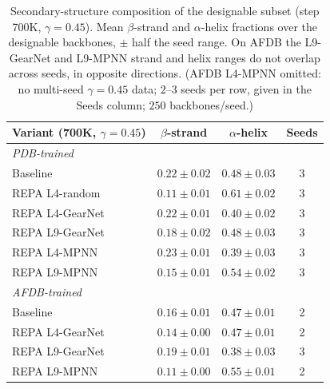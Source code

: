\begin{table}[tbp]
\centering
\small
\setlength{\tabcolsep}{8pt}
\begin{tabular}{lccc}
\toprule
\textbf{Variant (700K, $\gamma{=}0.45$)} & \textbf{$\beta$-strand} & \textbf{$\alpha$-helix} & \textbf{Seeds} \\
\midrule
\multicolumn{4}{l}{\textit{PDB-trained}}\\
Baseline       & $0.22 \pm 0.02$ & $0.48 \pm 0.03$ & 3 \\
REPA L4-random & $0.11 \pm 0.01$ & $0.61 \pm 0.02$ & 3 \\
REPA L4-GearNet     & $0.22 \pm 0.01$ & $0.40 \pm 0.02$ & 3 \\
REPA L9-GearNet     & $0.18 \pm 0.02$ & $0.48 \pm 0.03$ & 3 \\
REPA L4-MPNN   & $0.23 \pm 0.01$ & $0.39 \pm 0.03$ & 3 \\
REPA L9-MPNN   & $0.15 \pm 0.01$ & $0.54 \pm 0.02$ & 3 \\
\midrule
\multicolumn{4}{l}{\textit{AFDB-trained}}\\
Baseline       & $0.16 \pm 0.01$ & $0.47 \pm 0.01$ & 2 \\
REPA L4-GearNet     & $0.14 \pm 0.00$ & $0.47 \pm 0.01$ & 2 \\
REPA L9-GearNet     & $0.19 \pm 0.01$ & $0.38 \pm 0.03$ & 3 \\
REPA L9-MPNN   & $0.11 \pm 0.00$ & $0.55 \pm 0.01$ & 2 \\
\bottomrule
\end{tabular}
\caption{Secondary-structure composition of the designable subset (step 700K, $\gamma{=}0.45$). Mean $\beta$-strand and $\alpha$-helix fractions over the designable backbones, $\pm$ half the seed range. On AFDB the L9-GearNet and L9-MPNN strand and helix ranges do not overlap across seeds, in opposite directions. (AFDB L4-MPNN omitted: no multi-seed $\gamma{=}0.45$ data; $2$--$3$ seeds per row, given in the Seeds column; $250$ backbones/seed.)}
\label{tab:ss-composition}
\end{table}
